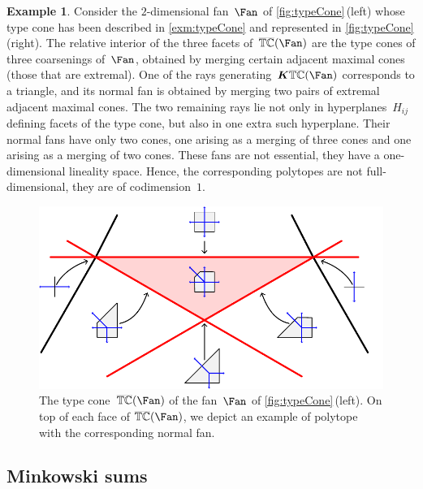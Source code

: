 \documentclass{amsart}
\theoremstyle{definition}
\newtheorem{example}[theorem]{Example}
\renewcommand{\b}[1]{{\boldsymbol{#1}}} %
\newcommand{\ctypeCone}{\smash{\overline{\mathbb{TC}}}} %
\begin{document}
\begin{example}
\label{exm:typeConeCoarsenings}
Consider the $2$-dimensional fan~$\Fan$ of \cref{fig:typeCone}\,(left) whose type cone has been described in \cref{exm:typeCone} and represented in \cref{fig:typeCone}\,(right).
The relative interior of the three facets of~$\ctypeCone(\Fan)$ are the type cones of three coarsenings of~$\Fan$, obtained by merging certain adjacent maximal cones (those that are extremal). One of the rays generating~$\b{K}\ctypeCone(\Fan)$ corresponds to a triangle, and its normal fan is obtained by merging two pairs of extremal adjacent maximal cones. The two remaining rays lie not only in hyperplanes~$H_{ij}$ defining facets of the type cone, but also in one extra such hyperplane. Their normal fans have only two cones, one arising as a merging of three cones and one arising as a merging of two cones. These fans are not essential, they have a one-dimensional lineality space. Hence, the corresponding polytopes are not full-dimensional, they are of codimension~$1$.

\begin{figure}[htpb]
	\capstart
	\centerline{\includegraphics[scale=.7]{typeConeCoarsenings}}
	\caption{The type cone~$\ctypeCone(\Fan)$ of the fan~$\Fan$ of \cref{fig:typeCone}\,(left). On top of each face of $\ctypeCone(\Fan)$, we depict an example of polytope with the corresponding normal fan.}
	\label{fig:typeConeCoarsenings}
\end{figure}
\end{example}


\subsection{Minkowski sums}
\label{subsec:MinkowskiSums}
\end{document}
